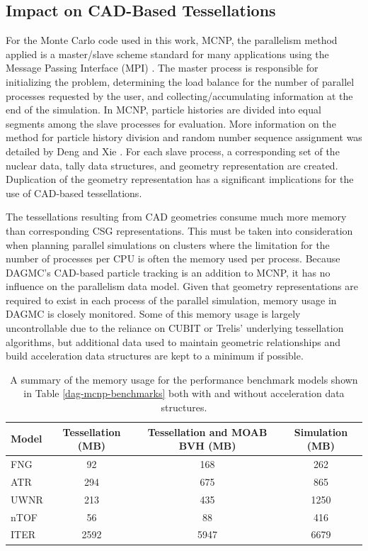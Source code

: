 \subsection{Impact on CAD-Based Tessellations}

For the Monte Carlo code used in this work, MCNP, the parallelism method applied
is a master/slave scheme standard for many applications using the Message
Passing Interface (MPI) \cite{Forum_1994}. The master process is responsible for
initializing the problem, determining the load balance for the number of
parallel processes requested by the user, and collecting/accumulating
information at the end of the simulation. In MCNP, particle histories are
divided into equal segments among the slave processes for evaluation. More
information on the method for particle history division and random number
sequence assignment was detailed by Deng and Xie \cite{Deng_1999}. For each
slave process, a corresponding set of the nuclear data, tally data structures,
and geometry representation are created. Duplication of the geometry
representation has a significant implications for the use of CAD-based
tessellations.

The tessellations resulting from CAD geometries consume much more memory than
corresponding CSG representations. This must be taken into consideration when
planning parallel simulations on clusters where the limitation for the number of
processes per CPU is often the memory used per process. Because DAGMC's
CAD-based particle tracking is an addition to MCNP, it has no influence on the
parallelism data model. Given that geometry representations are required to
exist in each process of the parallel simulation, memory usage in DAGMC is
closely monitored. Some of this memory usage is largely uncontrollable due to
the reliance on CUBIT or Trelis' underlying tessellation algorithms, but
additional data used to maintain geometric relationships and build acceleration
data structures are kept to a minimum if possible.

\begin{table}[H]
    \centering
  \begin{tabular}{l c c c}
    \toprule
    Model & Tessellation (MB) & Tessellation and MOAB BVH (MB) & Simulation (MB) \\
    \hline
    FNG   & 92           & 168 & 262  \\
    ATR   & 294          & 675 & 865  \\
    UWNR  & 213          & 435 & 1250 \\
    nTOF  & 56           & 88  & 416  \\
    ITER  & 2592  & 5947 &  6679\\
    \hline
  \end{tabular}
  \caption[Memory summary of performance benchmark models.]{A summary of the
    memory usage for the performance benchmark models shown in Table
    \ref{dag-mcnp-benchmarks} both with and without acceleration data structures.}
  \label{tab:dag-mcnp-benchmarks-mem}
\end{table}

